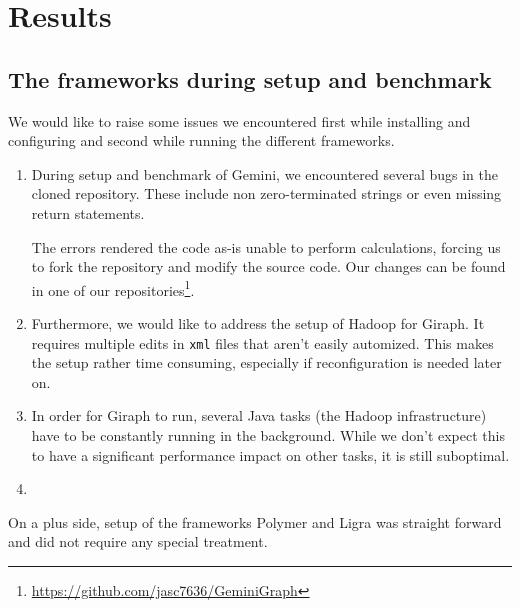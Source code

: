 
\section{Results}



\subsection{The frameworks during setup and benchmark}
We would like to raise some issues we encountered first while installing and configuring and second while running the different frameworks.

\begin{enumerate}
	\item During setup and benchmark of Gemini, we encountered several bugs in the cloned repository. These include non zero-terminated strings or even missing return statements.

	The errors rendered the code as-is unable to perform calculations, forcing us to fork the repository and modify the source code. Our changes can be found in one of our repositories\footnote{\url{https://github.com/jasc7636/GeminiGraph}}.

	\item Furthermore, we would like to address the setup of Hadoop for Giraph. It requires multiple edits in \texttt{xml} files that aren't easily automized. This makes the setup rather time consuming, especially if reconfiguration is needed later on.
	\item In order for Giraph to run, several Java tasks (the Hadoop infrastructure) have to be constantly running in the background. While we don't expect this to have a significant performance impact on other tasks, it is still suboptimal.

	\item
\end{enumerate}


On a plus side, setup of the frameworks Polymer and Ligra was straight forward and did not require any special treatment.





